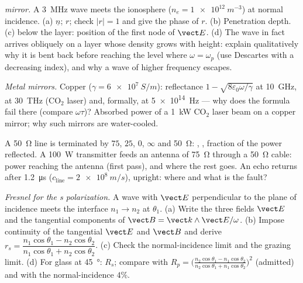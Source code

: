 \begin{exercise}[$\star\star$]\label{exo:b2:wave-interfaces:7}
\emph{ mirror.} A \qty{3}{MHz} wave meets the ionosphere ($n_e =
\qty{1e12}{m^{-3}}$) at normal incidence. (a) $\underline n$; $r$; check $|r| = 1$ and
give the phase of $r$. (b) Penetration depth. (c)  below the
layer: position of the first node of $\vect E$. (d) The wave in fact
arrives obliquely on a layer whose density grows with height: explain
qualitatively why it is bent back before reaching the level where
$\omega = \omega_p$ (use Descartes with a decreasing index), and why a wave of
higher frequency escapes.
\end{exercise}

\begin{exercise}[$\star\star$]\label{exo:b2:wave-interfaces:8}
\emph{Metal mirrors.} Copper ($\gamma = \qty{6e7}{S/m}$): reflectance $1 -
\sqrt{8\varepsilon_0\omega/\gamma}$ at \qty{10}{GHz}, at \qty{30}{THz} (CO$_2$ laser) and,
formally, at \qty{5e14}{Hz} --- why does the formula fail there (compare
$\omega\tau$)? Absorbed power of a \qty{1}{kW} CO$_2$ laser beam on a copper
mirror; why such mirrors are water-cooled.
\end{exercise}

\begin{exercise}[$\star\star$]\label{exo:b2:wave-interfaces:9}
A \qty{50}{\ohm} line is terminated by $75$, $25$, $0$, $\infty$ and \qty{50}{\ohm}:
, , fraction of the power
reflected. A \qty{100}{W} transmitter feeds an antenna of \qty{75}{\ohm}
through a \qty{50}{\ohm} cable: power reaching the antenna (first pass),
and where the rest goes. An echo returns after \qty{1.2}{\micro s} ($c_{\text{line}}
= \qty{2e8}{m/s}$), upright: where and what is the fault?
\end{exercise}

\begin{exercise}[$\star\star\star$]\label{exo:b2:wave-interfaces:10}
\emph{Fresnel for the s polarization.} A wave with $\vect E$ perpendicular
to the plane of incidence meets the interface $n_1 \to n_2$ at $\theta_1$.
(a) Write the three fields $\vect E$ and the tangential components of
$\vect B = \vect k\wedge\vect E/\omega$. (b) Impose continuity of the tangential
$\vect E$ and $\vect B$ and derive $r_s = \dfrac{n_1\cos\theta_1 - n_2\cos\theta_2}
{n_1\cos\theta_1 + n_2\cos\theta_2}$. (c) Check the normal-incidence limit and the
grazing limit. (d) For glass at \qty{45}{\degree}: $R_s$; compare with $R_p
= \bigl(\frac{n_2\cos\theta_1 - n_1\cos\theta_2}{n_2\cos\theta_1 + n_1\cos\theta_2}\bigr)^2$
(admitted) and with the normal-incidence $4\%$.
\end{exercise}

